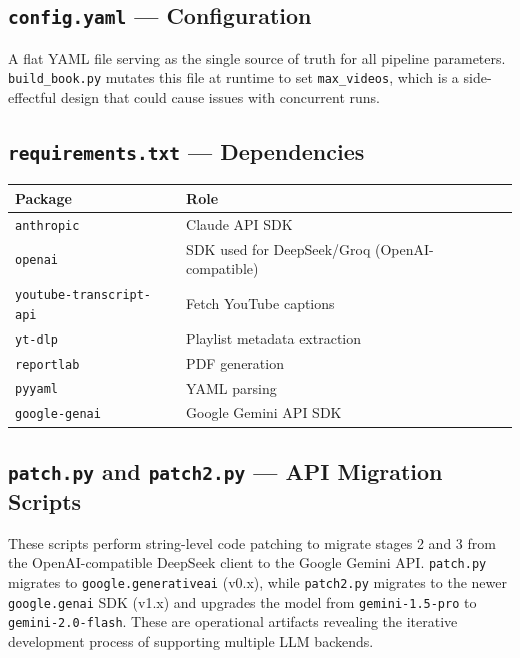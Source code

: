 \documentclass[11pt,a4paper]{article}
\begin{document}
\subsection{\texttt{config.yaml} --- Configuration}

A flat YAML file serving as the single source of truth for all pipeline parameters. \texttt{build\_book.py} mutates this file at runtime to set \texttt{max\_videos}, which is a side-effectful design that could cause issues with concurrent runs.

\subsection{\texttt{requirements.txt} --- Dependencies}

\begin{center}
\begin{tabular}{ll}
\toprule
\textbf{Package} & \textbf{Role}\\
\midrule
\texttt{anthropic} & Claude API SDK\\
\texttt{openai} & SDK used for DeepSeek/Groq (OpenAI-compatible)\\
\texttt{youtube-transcript-api} & Fetch YouTube captions\\
\texttt{yt-dlp} & Playlist metadata extraction\\
\texttt{reportlab} & PDF generation\\
\texttt{pyyaml} & YAML parsing\\
\texttt{google-genai} & Google Gemini API SDK\\
\bottomrule
\end{tabular}
\end{center}

\subsection{\texttt{patch.py} and \texttt{patch2.py} --- API Migration Scripts}

These scripts perform string-level code patching to migrate stages 2 and 3 from the OpenAI-compatible DeepSeek client to the Google Gemini API. \texttt{patch.py} migrates to \texttt{google.generativeai} (v0.x), while \texttt{patch2.py} migrates to the newer \texttt{google.genai} SDK (v1.x) and upgrades the model from \texttt{gemini-1.5-pro} to \texttt{gemini-2.0-flash}. These are operational artifacts revealing the iterative development process of supporting multiple LLM backends.

\end{document}
